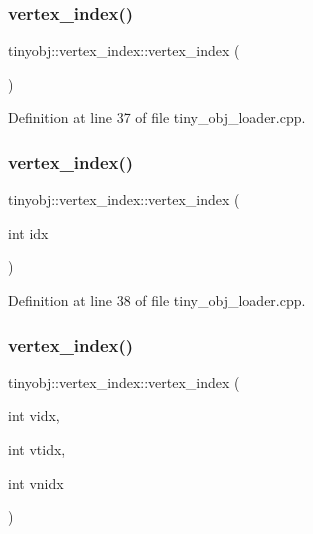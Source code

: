 \subsubsection{\texorpdfstring{vertex\+\_\+index()}{vertex\_index()}\hspace{0.1cm}{\footnotesize\ttfamily [1/3]}}
{\footnotesize\ttfamily tinyobj\+::vertex\+\_\+index\+::vertex\+\_\+index (\begin{DoxyParamCaption}{ }\end{DoxyParamCaption})\hspace{0.3cm}{\ttfamily [inline]}}



Definition at line 37 of file tiny\+\_\+obj\+\_\+loader.\+cpp.

\mbox{\label{structtinyobj_1_1vertex__index_a894075fa64d32082219c138f111e4753}} 
\subsubsection{\texorpdfstring{vertex\+\_\+index()}{vertex\_index()}\hspace{0.1cm}{\footnotesize\ttfamily [2/3]}}
{\footnotesize\ttfamily tinyobj\+::vertex\+\_\+index\+::vertex\+\_\+index (\begin{DoxyParamCaption}\item[{int}]{idx }\end{DoxyParamCaption})\hspace{0.3cm}{\ttfamily [inline]}}



Definition at line 38 of file tiny\+\_\+obj\+\_\+loader.\+cpp.

\mbox{\label{structtinyobj_1_1vertex__index_aa3c4d6bcba36c2abb06e25497a1376a1}} 
\subsubsection{\texorpdfstring{vertex\+\_\+index()}{vertex\_index()}\hspace{0.1cm}{\footnotesize\ttfamily [3/3]}}
{\footnotesize\ttfamily tinyobj\+::vertex\+\_\+index\+::vertex\+\_\+index (\begin{DoxyParamCaption}\item[{int}]{vidx,  }\item[{int}]{vtidx,  }\item[{int}]{vnidx }\end{DoxyParamCaption})\hspace{0.3cm}{\ttfamily [inline]}}



